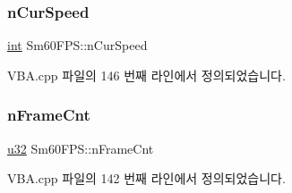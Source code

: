 \subsubsection{\texorpdfstring{n\+Cur\+Speed}{nCurSpeed}}
{\footnotesize\ttfamily \mbox{\hyperlink{_util_8cpp_a0ef32aa8672df19503a49fab2d0c8071}{int}} Sm60\+F\+P\+S\+::n\+Cur\+Speed}



V\+B\+A.\+cpp 파일의 146 번째 라인에서 정의되었습니다.

\mbox{\label{namespace_sm60_f_p_s_af16a9bcb3b2eba01862bc42cd189c524}} 
\subsubsection{\texorpdfstring{n\+Frame\+Cnt}{nFrameCnt}}
{\footnotesize\ttfamily \mbox{\hyperlink{_system_8h_a10e94b422ef0c20dcdec20d31a1f5049}{u32}} Sm60\+F\+P\+S\+::n\+Frame\+Cnt}



V\+B\+A.\+cpp 파일의 142 번째 라인에서 정의되었습니다.

